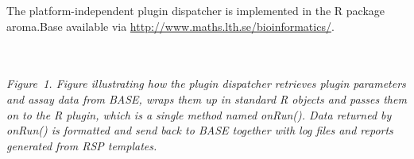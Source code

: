 \documentclass[portrait,plainsections]{sciposter}
\newlength{\dblcolwidth}
\begin{document}
\begin{multicols}{3}
\begin{minipage}{\columnwidth}
The platform-independent plugin dispatcher is implemented in the R package aroma.Base available via \url{http://www.maths.lth.se/bioinformatics/}.
\end{minipage}
\columnbreak
\begin{minipage}{\dblcolwidth}
~\\[1em]
~\\[0.5ex]
\emph{Figure~1. Figure illustrating how the plugin dispatcher retrieves plugin parameters and assay data from BASE, wraps them up in standard R objects and passes them on to the R plugin, which is a single method named onRun().  Data returned by onRun() is formatted and send back to BASE together with log files and reports generated from RSP templates.}
\end{minipage}
\end{multicols}                                          %
\end{document}
